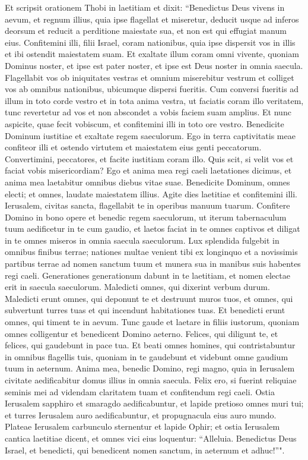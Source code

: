\begin{biblechapter}  
\verse Et scripsit orationem Thobi in laetitiam et dixit: 
\verse “Benedictus Deus vivens in aevum, et regnum illius, quia ipse flagellat et miseretur, deducit usque ad inferos deorsum et reducit a perditione maiestate sua, et non est qui effugiat manum eius. 
\verse Confitemini illi, filii Israel, coram nationibus, quia ipse dispersit vos in illis 
\verse et ibi ostendit maiestatem suam. Et exaltate illum coram omni vivente, quoniam Dominus noster, et ipse est pater noster, et ipse est Deus noster in omnia saecula. 
\verse Flagellabit vos ob iniquitates vestras et omnium miserebitur vestrum et colliget vos ab omnibus nationibus, ubicumque dispersi fueritis. 
\verse Cum conversi fueritis ad illum in toto corde vestro et in tota anima vestra, ut faciatis coram illo veritatem, tunc revertetur ad vos et non abscondet a vobis faciem suam amplius. Et nunc aspicite, quae fecit vobiscum, et confitemini illi in toto ore vestro. Benedicite Dominum iustitiae et exaltate regem saeculorum. Ego in terra captivitatis meae confiteor illi et ostendo virtutem et maiestatem eius genti peccatorum. Convertimini, peccatores, et facite iustitiam coram illo. Quis scit, si velit vos et faciat vobis misericordiam? 
\verse Ego et anima mea regi caeli laetationes dicimus, et anima mea laetabitur omnibus diebus vitae suae. 
\verse Benedicite Dominum, omnes electi; et omnes, laudate maiestatem illius. Agite dies laetitiae et confitemini illi. 
\verse Ierusalem, civitas sancta, flagellabit te in operibus manuum tuarum. 
\verse Confitere Domino in bono opere et benedic regem saeculorum, ut iterum tabernaculum tuum aedificetur in te cum gaudio, et laetos faciat in te omnes captivos et diligat in te omnes miseros in omnia saecula saeculorum. 
\verse Lux splendida fulgebit in omnibus finibus terrae; nationes multae venient tibi ex longinquo et a novissimis partibus terrae ad nomen sanctum tuum et munera sua in manibus suis habentes regi caeli. Generationes generationum dabunt in te laetitiam, et nomen electae erit in saecula saeculorum. 
\verse Maledicti omnes, qui dixerint verbum durum. Maledicti erunt omnes, qui deponunt te et destruunt muros tuos, et omnes, qui subvertunt turres tuas et qui incendunt habitationes tuas. Et benedicti erunt omnes, qui timent te in aevum. 
\verse Tunc gaude et laetare in filiis iustorum, quoniam omnes colligentur et benedicent Domino aeterno. 
\verse Felices, qui diligunt te, et felices, qui gaudebunt in pace tua. Et beati omnes homines, qui contristabuntur in omnibus flagellis tuis, quoniam in te gaudebunt et videbunt omne gaudium tuum in aeternum. 
\verse Anima mea, benedic Domino, regi magno, 
\verse quia in Ierusalem civitate aedificabitur domus illius in omnia saecula. Felix ero, si fuerint reliquiae seminis mei ad videndam claritatem tuam et confitendum regi caeli. Ostia Ierusalem sapphiro et smaragdo aedificabuntur, et lapide pretioso omnes muri tui; et turres Ierusalem auro aedificabuntur, et propugnacula eius auro mundo. 
\verse Plateae Ierusalem carbunculo sternentur et lapide Ophir; 
\verse et ostia Ierusalem cantica laetitiae dicent, et omnes vici eius loquentur: “Alleluia. Benedictus Deus Israel, et benedicti, qui benedicent nomen sanctum, in aeternum et adhuc!”". 
\end{biblechapter}

